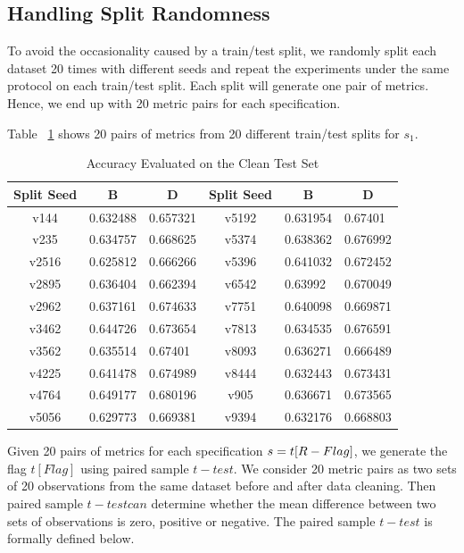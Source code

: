 \subsection{Handling Split Randomness}
To avoid the occasionality caused by a train/test split, we randomly split each dataset 20 times with different seeds and repeat the experiments under the same protocol on each train/test split. Each split will generate one pair of metrics. Hence, we end up with
20 metric pairs for each specification.

\begin{example}
	Table ~\ref{tab:accuracy-evulated-on-the-clean-test-set} shows 20 pairs of metrics from 20 different train/test splits for $s_{1}$.
\end{example}

\begin{table}[ht]
	\centering
	\begin{tabular}{|c|l|l|c|l|l|}
		\hline
		Split Seed & \multicolumn{1}{c|}{B} & \multicolumn{1}{c|}{D} & Split Seed & \multicolumn{1}{c|}{B} & \multicolumn{1}{c|}{D} \\ \hline
		v144 & 0.632488 & 0.657321 & v5192 & 0.631954 & 0.67401 \\ \hline
		v235 & 0.634757 & 0.668625 & v5374 & 0.638362 & 0.676992 \\ \hline
		v2516 & 0.625812 & 0.666266 & v5396 & 0.641032 & 0.672452 \\ \hline
		v2895 & 0.636404 & 0.662394 & v6542 & 0.63992 & 0.670049 \\ \hline
		v2962 & 0.637161 & 0.674633 & v7751 & 0.640098 & 0.669871 \\ \hline
		v3462 & 0.644726 & 0.673654 & v7813 & 0.634535 & 0.676591 \\ \hline
		v3562 & 0.635514 & 0.67401 & v8093 & 0.636271 & 0.666489 \\ \hline
		v4225 & 0.641478 & 0.674989 & v8444 & 0.632443 & 0.673431 \\ \hline
		v4764 & 0.649177 & 0.680196 & v905 & 0.636671 & 0.673565 \\ \hline
		v5056 & 0.629773 & 0.669381 & v9394 & 0.632176 & 0.668803 \\ \hline
	\end{tabular}
	\caption{Accuracy Evaluated on the Clean Test Set}
	\label{tab:accuracy-evulated-on-the-clean-test-set}
\end{table}

Given 20 pairs of metrics for each specification $s = t[R \-- Flag]$,
we generate the flag $t[Flag]$ using paired sample $t-test$. We consider 20 metric pairs as two sets of 20 observations from the same dataset before and after data cleaning. 
Then paired sample $t-test can$ determine whether the mean difference between two sets of
observations is zero, positive or negative. The paired sample $t-test$ is formally defined below. 

